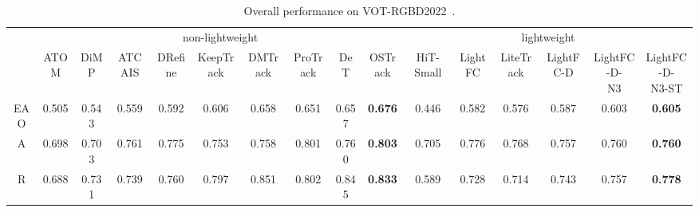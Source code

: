 \begin{table*}[t]
\centering
\footnotesize
\renewcommand{\arraystretch}{1.05}
\setlength{\tabcolsep}{1.0pt}

\begin{tabular}{c|ccccccccc|cccccc}
\hline
\multirow{2}{*}{} & \multicolumn{9}{c|}{non-lightweight}                                                & \multicolumn{6}{c}{lightweight}                                              \\ \cline{2-16} 
                  & \thead{ATOM \\~\cite{atom}}  & \thead{DiMP \\~\cite{dimp}}  & \thead{ATCAIS \\~\cite{vot20}} & \thead{DRefine \\~\cite{vot21}} & \thead{KeepTrack\\~\cite{keeptrack}} & \thead{DMTrack \\~\cite{vot22}} & \thead{ProTrack \\~\cite{protrack}} & \thead{DeT \\~\cite{det}}   & \thead{OSTrack \\~\cite{ostrack}} & \thead{HiT-Small \\~\cite{hit}} & \thead{LightFC \\~\cite{lightfc}} & \thead{LiteTrack \\~\cite{litetrack}} & \thead{LightFC-D \\ \ } & \thead{LightFC-D- \\N3} & \thead{LightFC-D- \\N3-ST} \\ \hline
EAO               & 0.505 & 0.543 & 0.559  & 0.592   & 0.606     & 0.658   & 0.651    & 0.657 & \color{red}\textbf{0.676}   & 0.446     & 0.582   & 0.576     & 0.587     & 0.603        & \color{blue}\textbf{0.605}           \\
A                 & 0.698 & 0.703 & 0.761  & 0.775   & 0.753     & 0.758   & 0.801    & 0.760 & \color{red}\textbf{0.803}   & 0.705     & 0.776   & 0.768     & 0.757     & 0.760        & \color{blue}\textbf{0.760}           \\
R                 & 0.688 & 0.731 & 0.739  & 0.760   & 0.797     & 0.851   & 0.802    & 0.845 & \color{red}\textbf{0.833}   & 0.589     & 0.728   & 0.714     & 0.743     & 0.757        & \color{blue}\textbf{0.778}           \\ \hline
\end{tabular}
\caption{Overall performance on VOT-RGBD2022~\cite{vot22}. 
}
\label{table rgbd vot2022}
\end{table*}
